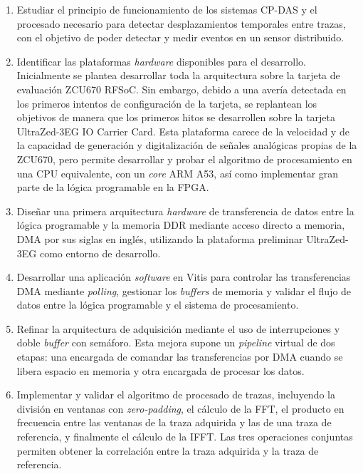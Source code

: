 \begin{enumerate}
	\item Estudiar el principio de funcionamiento de los sistemas CP-DAS y el procesado necesario para detectar desplazamientos temporales entre trazas, con el objetivo de poder detectar y medir eventos en un sensor distribuido.
	
	\item Identificar las plataformas \textit{hardware} disponibles para el desarrollo. Inicialmente se plantea desarrollar toda la arquitectura sobre la tarjeta de evaluación ZCU670 RFSoC. Sin embargo, debido a una avería detectada en los primeros intentos de configuración de la tarjeta, se replantean los objetivos de manera que los primeros hitos se desarrollen sobre la tarjeta UltraZed-3EG IO Carrier Card. Esta plataforma carece de la velocidad y de la capacidad de generación y digitalización de señales analógicas propias de la ZCU670, pero permite desarrollar y probar el algoritmo de procesamiento en una CPU equivalente, con un \textit{core} ARM A53, así como implementar gran parte de la lógica programable en la FPGA.
	
	\item Diseñar una primera arquitectura \textit{hardware} de transferencia de datos entre la lógica programable y la memoria DDR mediante acceso directo a memoria, DMA por sus siglas en inglés, utilizando la plataforma preliminar UltraZed-3EG como entorno de desarrollo.
	
	\item Desarrollar una aplicación \textit{software} en Vitis para controlar las transferencias DMA mediante \textit{polling}, gestionar los \textit{buffers} de memoria y validar el flujo de datos entre la lógica programable y el sistema de procesamiento.
	
	\item Refinar la arquitectura de adquisición mediante el uso de interrupciones y doble \textit{buffer} con semáforo. Esta mejora supone un \textit{pipeline} virtual de dos etapas: una encargada de comandar las transferencias por DMA cuando se libera espacio en memoria y otra encargada de procesar los datos.
	
	\item Implementar y validar el algoritmo de procesado de trazas, incluyendo la división en ventanas con \textit{zero-padding}, el cálculo de la FFT, el producto en frecuencia entre las ventanas de la traza adquirida y las de una traza de referencia, y finalmente el cálculo de la IFFT. Las tres operaciones conjuntas permiten obtener la correlación entre la traza adquirida y la traza de referencia.
	

\end{enumerate}
